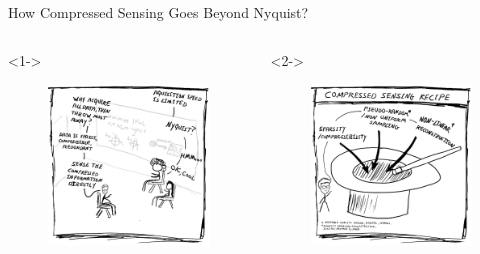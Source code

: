 \begin{frame}{How Compressed Sensing Goes Beyond Nyquist?}

	\begin{columns}
		\begin{column}{0.45\textwidth}<1->
			\begin{figure}
				\includegraphics[width=\columnwidth]{fig/comics_04.png}
			\end{figure}
		\end{column}
		\begin{column}{0.45\textwidth}<2->
			\begin{figure}
				\includegraphics[width=\columnwidth]{fig/comics_05.png}
			\end{figure}
		\end{column}
	\end{columns}
\end{frame}


